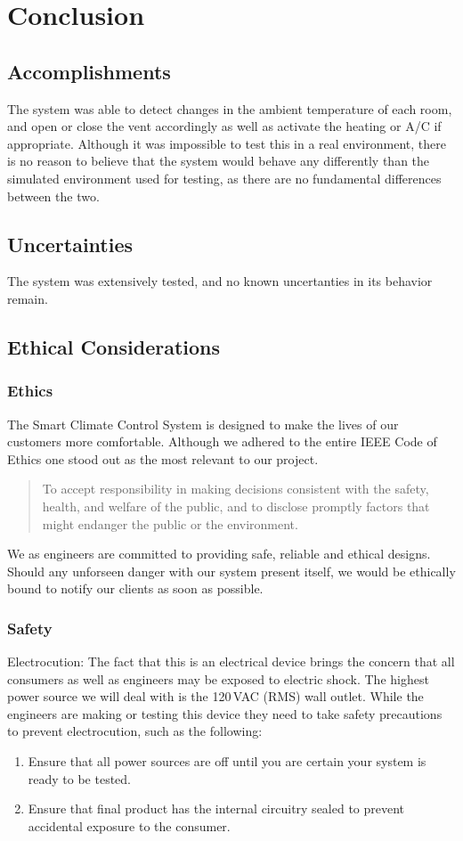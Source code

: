 \section{Conclusion}
\subsection{Accomplishments}
The system was able to detect changes in the ambient temperature of each room, and open or close the vent accordingly as well as activate the heating or A/C if appropriate.  Although it was impossible to test this in a real environment, there is no reason to believe that the system would behave any differently than the simulated environment used for testing, as there are no fundamental differences between the two.
\subsection{Uncertainties}
The system was extensively tested, and no known uncertanties in its behavior remain.
\subsection{Ethical Considerations}
\subsubsection{Ethics}
The Smart Climate Control System is designed to make the lives of our customers more comfortable. Although we adhered to the entire IEEE Code of Ethics one stood out as the most relevant to our project.
\begin{quote}
To accept responsibility in making decisions consistent with the safety, health, and welfare of the public, and to disclose promptly factors that might endanger the public or the environment.
\end{quote}
We as engineers are committed to providing safe, reliable and ethical designs.  Should any unforseen danger with our system present itself, we would be ethically bound to notify our clients as soon as possible.

\subsubsection{Safety}
Electrocution: The fact that this is an electrical device brings the concern that all consumers as well as engineers may be exposed to electric shock. The highest power source we will deal with is the 120\,VAC (RMS) wall outlet. While the engineers are making or testing this device they need to take safety precautions to prevent electrocution, such as the following:
\begin{enumerate}
\item
Ensure that all power sources are off until you are certain your system is ready to be tested.
\item
Ensure that final product has the internal circuitry sealed to prevent accidental exposure to the consumer.
\end{enumerate}


